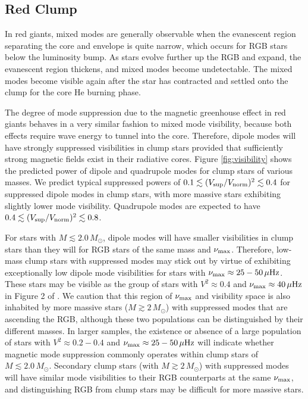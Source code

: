 \subsection{Red Clump}
\label{clump}
  

In red giants, mixed modes are generally observable when the evanescent region separating the core and envelope is quite narrow, which occurs for RGB stars below the luminosity bump. As stars evolve further up the RGB and expand, the evanescent region thickens, and mixed modes become undetectable. The mixed modes become visible again after the star has contracted and settled onto the clump for the core He burning phase. 

The degree of mode suppression due to the magnetic greenhouse effect in red giants behaves in a very similar fashion to mixed mode visibility, because both effects require wave energy to tunnel into the core. Therefore, dipole modes will have strongly suppressed visibilities in clump stars provided that sufficiently strong magnetic fields exist in their radiative cores. Figure \ref{fig:visibility} shows the predicted power of dipole and quadrupole modes for clump stars of various masses. We predict typical suppressed powers of $0.1 \lesssim (V_{\rm sup}/V_{\rm norm})^2 \lesssim 0.4$ for suppressed dipole modes in clump stars, with more massive stars exhibiting slightly lower mode visibility. Quadrupole modes are expected to have $0.4 \lesssim (V_{\rm sup}/V_{\rm norm})^2 \lesssim 0.8$. 

For stars with $M \lesssim 2.0 \, M_\odot$, dipole modes will have smaller visibilities in clump stars than they will for RGB stars of the same mass and $\nu_{\rm max}$. Therefore, low-mass clump stars with suppressed modes may stick out by virtue of exhibiting exceptionally low dipole mode visibilities for stars with $\nu_{\rm max} \approx 25-50 \, \mu {\rm Hz}$. These stars may be visible as the group of stars with $V^2 \approx 0.4$ and $\nu_{\rm max} \approx 40 \, \mu {\rm Hz}$ in Figure 2 of \cite{Fuller_2015}. We caution that this region of $\nu_{\rm max}$ and visibility space is also inhabited by more massive stars ($M \gtrsim 2 \, M_\odot$) with suppressed modes that are ascending the RGB, although these two populations can be distinguished by their different masses. In larger samples, the existence or absence of a large population of stars with $V^2 \approx 0.2-0.4$ and $\nu_{\rm max} \approx 25-50 \, \mu {\rm Hz}$ will indicate whether magnetic mode suppression commonly operates within clump stars of $M \lesssim 2.0 \, M_\odot$. Secondary clump stars (with $M \gtrsim 2 \, M_\odot$) with suppressed modes will have similar mode visibilities to their RGB counterparts at the same $\nu_{\rm max}$, and distinguishing RGB from clump stars may be difficult for more massive stars.
  
  
  
  
  
  
  
  
  